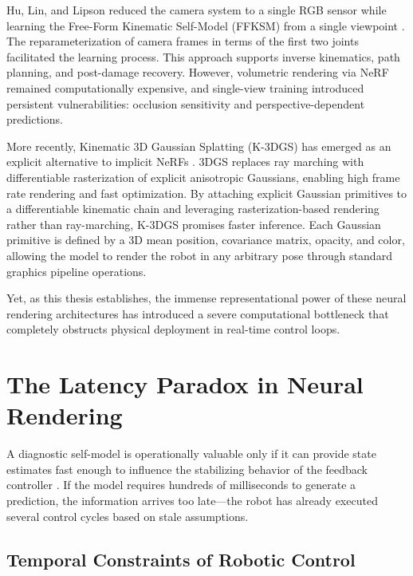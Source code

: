 \documentclass[12pt,a4paper,oneside]{report}
\begin{document}
Hu, Lin, and Lipson reduced the camera system to a single RGB sensor while learning the Free-Form Kinematic Self-Model (FFKSM) from a single viewpoint \cite{hu2024teaching}. The reparameterization of camera frames in terms of the first two joints facilitated the learning process. This approach supports inverse kinematics, path planning, and post-damage recovery. However, volumetric rendering via NeRF remained computationally expensive, and single-view training introduced persistent vulnerabilities: occlusion sensitivity and perspective-dependent predictions.

More recently, Kinematic 3D Gaussian Splatting (K-3DGS) has emerged as an explicit alternative to implicit NeRFs \cite{hu2025learning}. 3DGS replaces ray marching with differentiable rasterization of explicit anisotropic Gaussians, enabling high frame rate rendering and fast optimization. By attaching explicit Gaussian primitives to a differentiable kinematic chain and leveraging rasterization-based rendering rather than ray-marching, K-3DGS promises faster inference. Each Gaussian primitive is defined by a 3D mean position, covariance matrix, opacity, and color, allowing the model to render the robot in any arbitrary pose through standard graphics pipeline operations.

Yet, as this thesis establishes, the immense representational power of these neural rendering architectures has introduced a severe computational bottleneck that completely obstructs physical deployment in real-time control loops.

\section{The Latency Paradox in Neural Rendering}
\label{sec:latency_paradox}

A diagnostic self-model is operationally valuable only if it can provide state estimates fast enough to influence the stabilizing behavior of the feedback controller \cite{hu2024teaching, hu2025learning}. If the model requires hundreds of milliseconds to generate a prediction, the information arrives too late—the robot has already executed several control cycles based on stale assumptions.

\subsection{Temporal Constraints of Robotic Control}
\label{subsec:temporal_constraints}
\end{document}
